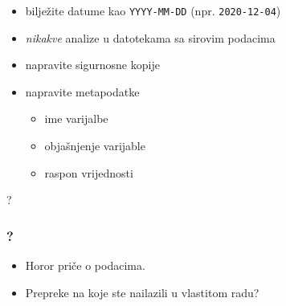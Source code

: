 \documentclass[aspectratio=169]{beamer}
\newenvironment{noheadline}{
    \setbeamertemplate{headline}{}
}{}
\begin{document}
\begin{frame}
    \begin{itemize}
        \setlength{\itemsep}{2em}

        \item bilježite datume kao \texttt{YYYY-MM-DD} (npr.
            \texttt{2020-12-04})

        \pause

        \item \textit{nikakve} analize u datotekama sa sirovim podacima

        \pause

        \item napravite sigurnosne kopije

        \pause

        \item napravite metapodatke

        \begin{itemize}
            \item ime varijalbe

            \item objašnjenje varijable

            \item raspon vrijednosti

        \end{itemize}

    \end{itemize}
\end{frame}

\begin{noheadline}
    \begin{frame}

    \fontsize{50}{52}\selectfont
    \centering
    ?
    \end{frame}
\end{noheadline}

\begin{frame}
    \frametitle{?}

    \begin{itemize}
        \setlength{\itemsep}{2em}

        \item Horor priče o podacima.

        \item Prepreke na koje ste nailazili u vlastitom radu?

    \end{itemize}

\end{frame}
\end{document}
